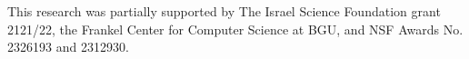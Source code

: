 \documentclass[acmsmall]{acmart}
\begin{document}


\maketitle















\begin{acks}
 This research was partially supported by The Israel Science Foundation grant 2121/22, the Frankel Center for Computer Science at BGU, and NSF Awards No. 2326193 and 2312930.
\end{acks}



\end{document}
